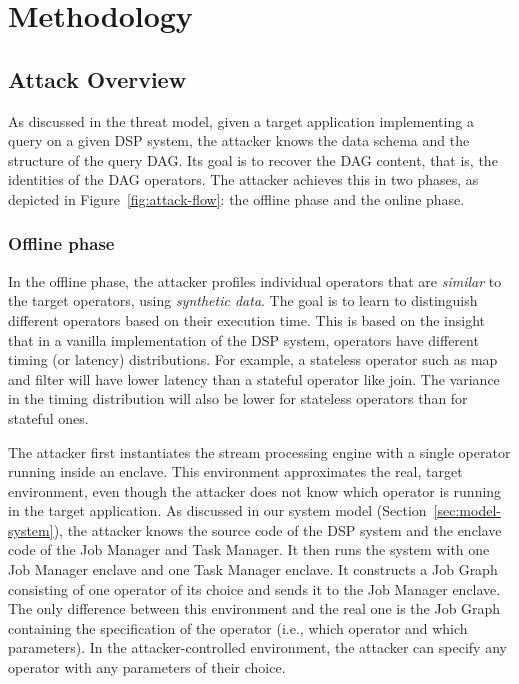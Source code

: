 \section{Methodology}
\label{sec:methodology}

\subsection{Attack Overview}
As discussed in the threat model, given a target application implementing a query on a given DSP system, the attacker
knows the data schema and the structure of the query DAG. Its goal is to recover the DAG content, that is, the
identities of the DAG operators. The attacker achieves this in two phases, as depicted in Figure~\ref{fig:attack-flow}:
the offline phase and the online phase.

\subsubsection*{Offline phase}
In the offline phase, the attacker profiles individual operators that are {\em similar} to the target operators, using
{\em synthetic data}. The goal is to learn to distinguish different operators based on their execution
time. This is based on the insight that in a vanilla implementation of the DSP system, operators have different
timing (or latency) distributions. For example, a stateless operator such as map and filter will have lower latency than
a stateful operator like join. The variance in the timing distribution will also be lower for stateless operators than
for stateful ones.

The attacker first instantiates the stream processing engine with a single operator running inside an enclave. This
environment approximates the real, target environment, even though the attacker does not know which operator is running
in the target application. As discussed in our system model (Section~\ref{sec:model-system}), the attacker knows the
source code of the DSP system and the enclave code of the Job Manager and Task Manager. It then runs the system with
one Job Manager enclave and one Task Manager enclave. It constructs a Job Graph consisting of one operator of its
choice and sends it to the Job Manager enclave. The only difference between this environment and the real one is the Job
Graph containing the specification of the operator (i.e., which operator and which parameters). In the attacker-controlled environment, the attacker can specify any operator with any parameters of their choice.  

